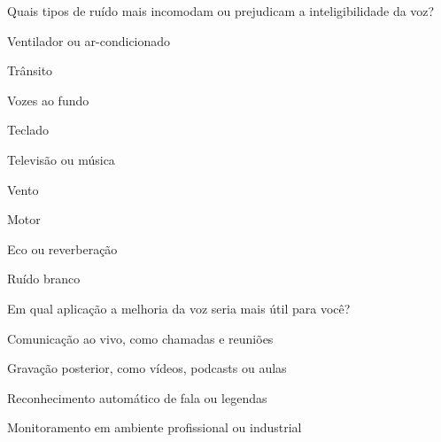 \begin{perguntaFormulario}{Quais tipos de ruído mais incomodam ou prejudicam a inteligibilidade da voz?}
\begin{opcoesFormularioDuasColunas}
    \item Ventilador ou ar-condicionado
    \item Trânsito
    \item Vozes ao fundo
    \item Teclado
    \item Televisão ou música
    \item Vento
    \item Motor
    \item Eco ou reverberação
    \item Ruído branco
\end{opcoesFormularioDuasColunas}
\end{perguntaFormulario}

\begin{perguntaFormulario}{Em qual aplicação a melhoria da voz seria mais útil para você?}
\begin{opcoesFormulario}
    \item Comunicação ao vivo, como chamadas e reuniões
    \item Gravação posterior, como vídeos, podcasts ou aulas
    \item Reconhecimento automático de fala ou legendas
    \item Monitoramento em ambiente profissional ou industrial
\end{opcoesFormulario}
\end{perguntaFormulario}


